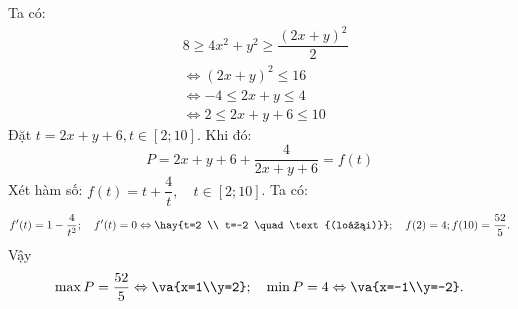 \lgi
Ta có:
\begin{align*}
& 8 \geq 4x^2+y^2 \geq \dfrac{(2x+y)^2}{2} \\
& \Leftrightarrow (2x+y)^2 \leq 16 \\
& \Leftrightarrow -4 \leq 2x+y \leq 4 \\
& \Leftrightarrow 2 \leq 2x +y +6 \leq 10
\end{align*}
Đặt $t=2x+y+6, t \in [2;10]$. Khi đó:
$$P=2x+y+6 +\dfrac{4}{2x+y+6} = f(t) $$
Xét hàm số: $f(t) = t+ \dfrac{4}{t}, \quad t \in [2;10]$. Ta có:
$$f'(t)=1-\dfrac{4}{t^2}; \quad f'(t) = 0 \Leftrightarrow \hay{t=2 \\ t=-2 \quad \text{(loại)}}; \quad f(2)=4; f(10)=\dfrac{52}{5}.$$
Vậy 
$$\max P = \dfrac{52}{5} \Leftrightarrow  \va{x=1\\y=2}; \quad \min P = 4 \Leftrightarrow \va{x=-1\\y=-2}.$$
